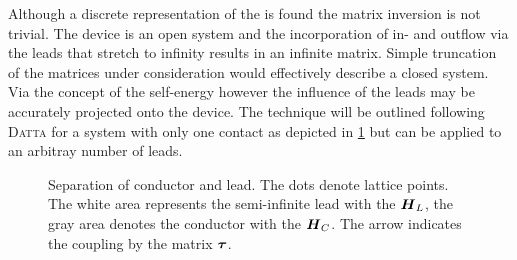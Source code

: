 Although a discrete representation of the \hamil{} is found the matrix inversion is not trivial. The device is an open system and the incorporation of in- and outflow via the leads that stretch to infinity results in an infinite matrix.
Simple truncation of the matrices under consideration would effectively describe a closed system. Via the concept of the self-energy however the influence of the leads may be accurately projected onto the device.
The technique will be outlined following \textsc{Datta} for a system with only one contact as depicted in \cref{fig:selfenergy} but can be applied to an arbitray number of leads. \begin{figure}[h!]
\centering
{}
\caption{Separation of conductor and lead. The dots denote lattice points. The white area represents the semi-infinite lead with the \hamil{} $\boldsymbol{H}_L$, the gray area denotes the conductor with the \hamil{} $\boldsymbol{H}_C$. The arrow indicates the coupling by the matrix $\boldsymbol{\tau}$.}
\label{fig:selfenergy}
\end{figure}
